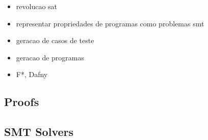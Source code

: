 %

\begin{itemize}
  \item revolucao sat
  \item representar propriedades de programas como problemas smt
  \item geracao de casos de teste
  \item geracao de programas
  \item F*, Dafny
\end{itemize}


\subsection{Proofs}

\subsection{SMT Solvers}


